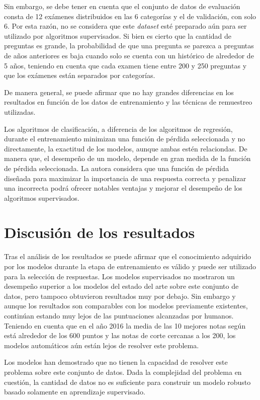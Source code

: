 Sin embargo, se debe tener en cuenta que el conjunto de datos de evaluación consta de 12 exámenes distribuidos en las 6 categorías y el de validación, con solo 6. Por esta razón, no se considera que este \textit{dataset} esté preparado aún para ser utilizado por algoritmos supervisados. Si bien es cierto que la cantidad de preguntas es grande, la probabilidad de que una pregunta se parezca a preguntas de años anteriores es baja cuando solo se cuenta con un histórico de alrededor de 5 años, teniendo en cuenta que cada examen tiene entre 200 y 250 preguntas y que los exámenes están separados por categorías.

De manera general, se puede afirmar que no hay grandes diferencias en los resultados en función de los datos de entrenamiento y las técnicas de remuestreo utilizadas. 

Los algoritmos de clasificación, a diferencia de los algoritmos de regresión, durante el entrenamiento minimizan una función de pérdida seleccionada y no directamente, la exactitud de los modelos, aunque ambas estén relaciondas. De manera que, el desempeño de un modelo, depende en gran medida de la función de pérdida seleccionada. La autora considera que una función de pérdida diseñada para maximizar la importancia de una respuesta correcta y penalizar una incorrecta podrá ofrecer notables ventajas y mejorar el desempeño de los algoritmos supervisados. 

\section{Discusión de los resultados}

Tras el análisis de los resultados se puede afirmar que el conocimiento adquirido por los modelos durante la etapa de entrenamiento es válido y puede ser utilizado para la selección de respuestas. Los modelos supervisados no mostraron un desempeño superior a los modelos del estado del arte sobre este conjunto de datos, pero tampoco obtuvieron resultados muy por debajo. Sin embargo y aunque los resultados son comparables con los modelos previamente existentes, continúan estando muy lejos de las puntuaciones alcanzadas por humanos. Teniendo en cuenta que en el año 2016 la media de las 10 mejores notas según \cite{2019-head-qa} está alrededor de los 600 puntos y las notas de corte cercanas a los 200, los modelos automáticos aún están lejos de resolver este problema.

Los modelos han demostrado que no tienen la capacidad de resolver este problema sobre este conjunto de datos. Dada la complejidad del problema en cuestión, la cantidad de datos no es suficiente para construir un modelo robusto basado solamente en aprendizaje supervisado. 